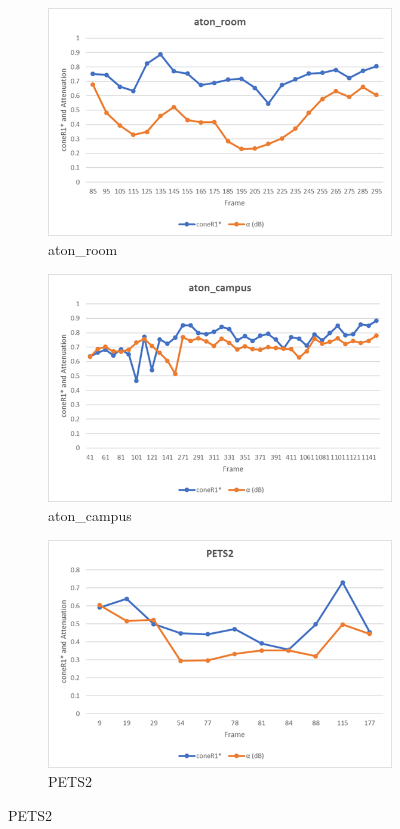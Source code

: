 \begin{figure}
  \centering
  \begin{subfigure}{1\linewidth}
  \includegraphics[width=1\linewidth]{figures/room_db_corr.jpg}
  \caption{aton\_room}
\end{subfigure}
\hfill
\begin{subfigure}{.49\linewidth}
  \includegraphics[width=1\linewidth]{figures/campus_db_corr.jpg}
  \caption{aton\_campus}
\end{subfigure}
\begin{subfigure}{.49\linewidth}
  \includegraphics[width=1\linewidth]{figures/pets2_db_corr.jpg}
  \caption{PETS2}
\end{subfigure}


\end{figure}
